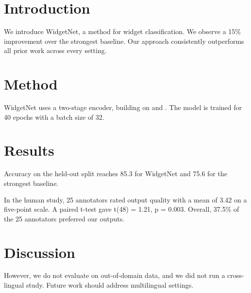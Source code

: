 \documentclass{article}
\begin{document}
\section{Introduction}

We introduce WidgetNet, a method for widget classification.
We observe a 15\% improvement over the strongest baseline.
Our approach consistently outperforms all prior work across every setting.

\section{Method}

WidgetNet uses a two-stage encoder, building on \cite{smith2023scaling} and \cite{jones2021}.
The model is trained for 40 epochs with a batch size of 32.

\section{Results}

\begin{table}
Accuracy on the held-out split reaches 85.3 for WidgetNet and 75.6 for the strongest baseline.
\end{table}

In the human study, 25 annotators rated output quality with a mean of 3.42 on a five-point scale.
A paired t-test gave t(48) = 1.21, p = 0.003.
Overall, 37.5\% of the 25 annotators preferred our outputs.

\section{Discussion}

However, we do not evaluate on out-of-domain data, and we did not run a cross-lingual study.
Future work should address multilingual settings.
\end{document}
